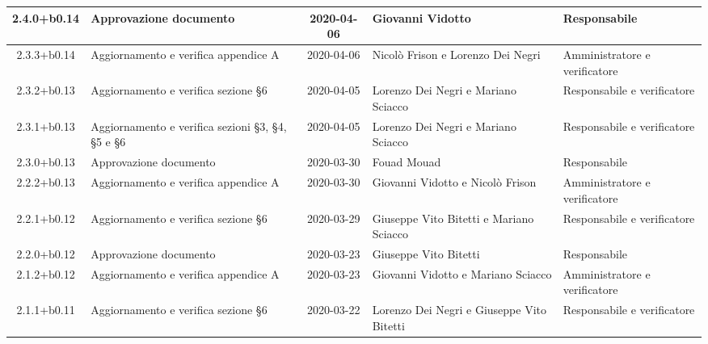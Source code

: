 \begin{center}
\begin{longtable}{|c|p{3.5cm}|c|p{3cm}|p{3cm}|}
	2.4.0+b0.14 & Approvazione documento & 2020-04-06 & Giovanni Vidotto & Responsabile \\
	\hline
	2.3.3+b0.14 & Aggiornamento e verifica appendice A & 2020-04-06 & Nicolò Frison e Lorenzo Dei Negri & Amministratore e verificatore \\
	\hline
	2.3.2+b0.13 & Aggiornamento e verifica sezione \S6 & 2020-04-05 & Lorenzo Dei Negri e Mariano Sciacco & Responsabile e verificatore \\
	\hline
	2.3.1+b0.13 & Aggiornamento e verifica sezioni \S3, \S4, \S5 e \S6 & 2020-04-05 & Lorenzo Dei Negri e Mariano Sciacco & Responsabile e verificatore \\
	\hline
	
	2.3.0+b0.13 & Approvazione documento & 2020-03-30 & Fouad Mouad & Responsabile \\
	\hline
	2.2.2+b0.13 & Aggiornamento e verifica appendice A & 2020-03-30 & Giovanni Vidotto e Nicolò Frison & Amministratore e verificatore \\
	\hline
	2.2.1+b0.12 & Aggiornamento e verifica sezione \S6 & 2020-03-29 & Giuseppe Vito Bitetti e Mariano Sciacco & Responsabile e verificatore \\
	\hline
	
	2.2.0+b0.12 & Approvazione documento & 2020-03-23 & Giuseppe Vito Bitetti & Responsabile \\
	\hline
	2.1.2+b0.12 & Aggiornamento e verifica appendice A & 2020-03-23 & Giovanni Vidotto e Mariano Sciacco & Amministratore e verificatore \\
	\hline
	2.1.1+b0.11 & Aggiornamento e verifica sezione \S6 & 2020-03-22 & Lorenzo Dei Negri e Giuseppe Vito Bitetti & Responsabile e verificatore \\
	\hline


\end{longtable}
\end{center}

